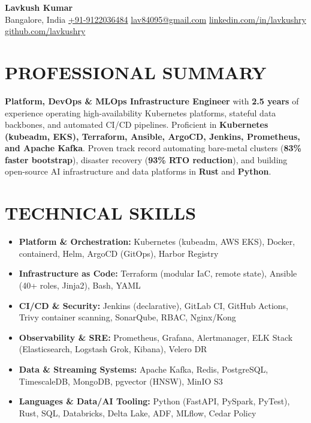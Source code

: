 \documentclass[a4paper,10pt]{article}
\begin{document}
\begin{center}
  {\fontsize{19}{21}\selectfont\bfseries\color{navy} Lavkush Kumar}\\[2.5pt]
  \small\color{soft}
  Bangalore, India \;\textbar\;
  \href{tel:+919122036484}{\color{accent}+91-9122036484} \;\textbar\;
  \href{mailto:lav84095@gmail.com}{\color{accent}lav84095@gmail.com} \;\textbar\;
  \href{https://www.linkedin.com/in/lavkushry/}{\color{accent}linkedin.com/in/lavkushry} \;\textbar\;
  \href{https://github.com/lavkushry}{\color{accent}github.com/lavkushry}
\end{center}
\vspace{-6pt}

\section{PROFESSIONAL SUMMARY}
\small\color{black}
\textbf{Platform, DevOps \& MLOps Infrastructure Engineer} with \textbf{2.5 years} of experience operating high-availability Kubernetes platforms, stateful data backbones, and automated CI/CD pipelines. Proficient in \textbf{Kubernetes (kubeadm, EKS), Terraform, Ansible, ArgoCD, Jenkins, Prometheus, and Apache Kafka}. Proven track record automating bare-metal clusters (\textbf{83\% faster bootstrap}), disaster recovery (\textbf{93\% R\mbox{}TO reduction}), and building open-source AI infrastructure and data platforms in \textbf{Rust} and \textbf{Python}.

\section{TECHNICAL SKILLS}
\begin{itemize}[leftmargin=0.0in, label={}, noitemsep, topsep=0.5pt, parsep=1.0pt, partopsep=0pt]
  \item \small \textbf{\color{navy}Platform \& Orchestration:} Kubernetes (kubeadm, AWS EKS), Docker, containerd, Helm, ArgoCD (GitOps), Harbor Registry
  \item \small \textbf{\color{navy}Infrastructure as Code:} Terraform (modular IaC, remote state), Ansible (40+ roles, Jinja2), Bash, YAML
  \item \small \textbf{\color{navy}CI/CD \& Security:} Jenkins (declarative), GitLab CI, GitHub Actions, Trivy container scanning, SonarQube, RBAC, Nginx/Kong
  \item \small \textbf{\color{navy}Observability \& SRE:} Prometheus, Grafana, Alertmanager, ELK Stack (Elasticsearch, Logstash Grok, Kibana), Velero DR
  \item \small \textbf{\color{navy}Data \& Streaming Systems:} Apache Kafka, Redis, PostgreSQL, TimescaleDB, MongoDB, pgvector (HNSW), MinIO S3
  \item \small \textbf{\color{navy}Languages \& Data/AI Tooling:} Python (FastAPI, PySpark, PyTest), Rust, SQL, Databricks, Delta Lake, ADF, MLflow, Cedar Policy
\end{itemize}
\end{document}
